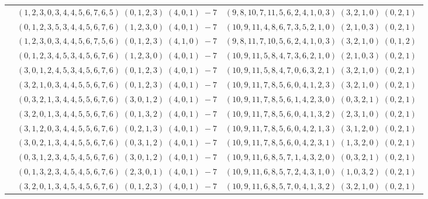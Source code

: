 \documentclass[11pt]{article}
\begin{document}
\begin{longtable}[l]{|c|c|c|}
 \cline{2-3} 
 & $(1 ,2 ,3 ,0 ,3 ,4 ,4 ,5 ,6 ,7 ,6 ,5) \;(0 ,1 ,2 ,3) \;(4 ,0 ,1) \;-7$ & $(9 ,8 ,10 ,7 ,11 ,5 ,6 ,2 ,4 ,1 ,0 ,3) \;(3 ,2 ,1 ,0) \;(0 ,2 ,1) \;$\\ 
 \cline{2-3} 
 & $(0 ,1 ,2 ,3 ,5 ,3 ,4 ,4 ,5 ,6 ,7 ,6) \;(1 ,2 ,3 ,0) \;(4 ,0 ,1) \;-7$ & $(10 ,9 ,11 ,4 ,8 ,6 ,7 ,3 ,5 ,2 ,1 ,0) \;(2 ,1 ,0 ,3) \;(0 ,2 ,1) \;$\\ 
 \cline{2-3} 
 & $(1 ,2 ,3 ,0 ,3 ,4 ,4 ,5 ,6 ,7 ,5 ,6) \;(0 ,1 ,2 ,3) \;(4 ,1 ,0) \;-7$ & $(9 ,8 ,11 ,7 ,10 ,5 ,6 ,2 ,4 ,1 ,0 ,3) \;(3 ,2 ,1 ,0) \;(0 ,1 ,2) \;$\\ 
 \cline{2-3} 
 & $(0 ,1 ,2 ,3 ,4 ,5 ,3 ,4 ,5 ,6 ,7 ,6) \;(1 ,2 ,3 ,0) \;(4 ,0 ,1) \;-7$ & $(10 ,9 ,11 ,5 ,8 ,4 ,7 ,3 ,6 ,2 ,1 ,0) \;(2 ,1 ,0 ,3) \;(0 ,2 ,1) \;$\\ 
 \cline{2-3} 
 & $(3 ,0 ,1 ,2 ,4 ,5 ,3 ,4 ,5 ,6 ,7 ,6) \;(0 ,1 ,2 ,3) \;(4 ,0 ,1) \;-7$ & $(10 ,9 ,11 ,5 ,8 ,4 ,7 ,0 ,6 ,3 ,2 ,1) \;(3 ,2 ,1 ,0) \;(0 ,2 ,1) \;$\\ 
 \cline{2-3} 
 & $(3 ,2 ,1 ,0 ,3 ,4 ,4 ,5 ,5 ,6 ,7 ,6) \;(0 ,1 ,2 ,3) \;(4 ,0 ,1) \;-7$ & $(10 ,9 ,11 ,7 ,8 ,5 ,6 ,0 ,4 ,1 ,2 ,3) \;(3 ,2 ,1 ,0) \;(0 ,2 ,1) \;$\\ 
 \cline{2-3} 
 & $(0 ,3 ,2 ,1 ,3 ,4 ,4 ,5 ,5 ,6 ,7 ,6) \;(3 ,0 ,1 ,2) \;(4 ,0 ,1) \;-7$ & $(10 ,9 ,11 ,7 ,8 ,5 ,6 ,1 ,4 ,2 ,3 ,0) \;(0 ,3 ,2 ,1) \;(0 ,2 ,1) \;$\\ 
 \cline{2-3} 
 & $(3 ,2 ,0 ,1 ,3 ,4 ,4 ,5 ,5 ,6 ,7 ,6) \;(0 ,1 ,3 ,2) \;(4 ,0 ,1) \;-7$ & $(10 ,9 ,11 ,7 ,8 ,5 ,6 ,0 ,4 ,1 ,3 ,2) \;(2 ,3 ,1 ,0) \;(0 ,2 ,1) \;$\\ 
 \cline{2-3} 
 & $(3 ,1 ,2 ,0 ,3 ,4 ,4 ,5 ,5 ,6 ,7 ,6) \;(0 ,2 ,1 ,3) \;(4 ,0 ,1) \;-7$ & $(10 ,9 ,11 ,7 ,8 ,5 ,6 ,0 ,4 ,2 ,1 ,3) \;(3 ,1 ,2 ,0) \;(0 ,2 ,1) \;$\\ 
 \cline{2-3} 
 & $(3 ,0 ,2 ,1 ,3 ,4 ,4 ,5 ,5 ,6 ,7 ,6) \;(0 ,3 ,1 ,2) \;(4 ,0 ,1) \;-7$ & $(10 ,9 ,11 ,7 ,8 ,5 ,6 ,0 ,4 ,2 ,3 ,1) \;(1 ,3 ,2 ,0) \;(0 ,2 ,1) \;$\\ 
 \cline{2-3} 
 & $(0 ,3 ,1 ,2 ,3 ,4 ,5 ,4 ,5 ,6 ,7 ,6) \;(3 ,0 ,1 ,2) \;(4 ,0 ,1) \;-7$ & $(10 ,9 ,11 ,6 ,8 ,5 ,7 ,1 ,4 ,3 ,2 ,0) \;(0 ,3 ,2 ,1) \;(0 ,2 ,1) \;$\\ 
 \cline{2-3} 
 & $(0 ,1 ,3 ,2 ,3 ,4 ,5 ,4 ,5 ,6 ,7 ,6) \;(2 ,3 ,0 ,1) \;(4 ,0 ,1) \;-7$ & $(10 ,9 ,11 ,6 ,8 ,5 ,7 ,2 ,4 ,3 ,1 ,0) \;(1 ,0 ,3 ,2) \;(0 ,2 ,1) \;$\\ 
 \cline{2-3} 
 & $(3 ,2 ,0 ,1 ,3 ,4 ,5 ,4 ,5 ,6 ,7 ,6) \;(0 ,1 ,2 ,3) \;(4 ,0 ,1) \;-7$ & $(10 ,9 ,11 ,6 ,8 ,5 ,7 ,0 ,4 ,1 ,3 ,2) \;(3 ,2 ,1 ,0) \;(0 ,2 ,1) \;$\\ 

\end{longtable}
\end{document}
